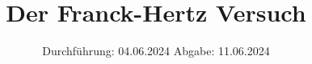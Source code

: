 

\subject{V601}
\title{Der Franck-Hertz Versuch}
\date{%
  Durchführung: 04.06.2024
  \hspace{3em}
  Abgabe: 11.06.2024
}



\maketitle
\thispagestyle{empty}
\tableofcontents
\newpage






\printbibliography{}


